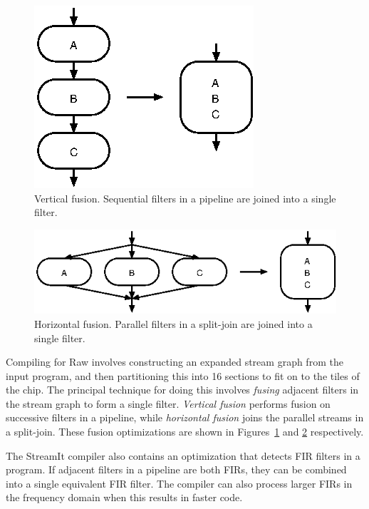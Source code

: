 \begin{figure}
  \centering
  \includegraphics{fusion-vert}
  \caption{Vertical fusion.  Sequential filters in a pipeline are
    joined into a single filter.}
  \label{fig:vert-fusion}
\end{figure}
\begin{figure}
  \centering
  \includegraphics{fusion-horiz}
  \caption{Horizontal fusion.  Parallel filters in a split-join are
    joined into a single filter.}
  \label{fig:horiz-fusion}
\end{figure}

Compiling for Raw involves constructing an expanded stream graph from
the input program, and then partitioning this into 16 sections to fit
on to the tiles of the chip\cite{gordon02}.  The principal technique
for doing this involves \emph{fusing} adjacent filters in the stream
graph to form a single filter.  \emph{Vertical fusion} performs fusion
on successive filters in a pipeline, while \emph{horizontal fusion}
joins the parallel streams in a split-join.  These fusion
optimizations are shown in Figures~\ref{fig:vert-fusion} and
\ref{fig:horiz-fusion} respectively.

The StreamIt compiler also contains an optimization that detects FIR
filters in a program\cite{lamb03}.  If adjacent filters in a pipeline
are both FIRs, they can be combined into a single equivalent FIR
filter.  The compiler can also process larger FIRs in the frequency
domain when this results in faster code.

